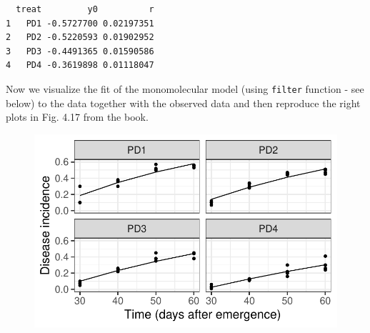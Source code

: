 \documentclass[
  letterpaper,
  DIV=11,
  numbers=noendperiod]{scrreprt}
\newenvironment{Shaded}{\begin{snugshade}}{\end{snugshade}}
\newcommand{\AttributeTok}[1]{\textcolor[rgb]{0.40,0.45,0.13}{#1}}
\newcommand{\CommentTok}[1]{\textcolor[rgb]{0.37,0.37,0.37}{#1}}
\newcommand{\DecValTok}[1]{\textcolor[rgb]{0.68,0.00,0.00}{#1}}
\newcommand{\FloatTok}[1]{\textcolor[rgb]{0.68,0.00,0.00}{#1}}
\newcommand{\FunctionTok}[1]{\textcolor[rgb]{0.28,0.35,0.67}{#1}}
\newcommand{\NormalTok}[1]{\textcolor[rgb]{0.00,0.23,0.31}{#1}}
\newcommand{\SpecialCharTok}[1]{\textcolor[rgb]{0.37,0.37,0.37}{#1}}
\newcommand{\StringTok}[1]{\textcolor[rgb]{0.13,0.47,0.30}{#1}}
\begin{document}
\begin{verbatim}
  treat         y0          r
1   PD1 -0.5727700 0.02197351
2   PD2 -0.5220593 0.01902952
3   PD3 -0.4491365 0.01590586
4   PD4 -0.3619898 0.01118047
\end{verbatim}

Now we visualize the fit of the monomolecular model (using
\texttt{filter} function - see below) to the data together with the
observed data and then reproduce the right plots in Fig. 4.17 from the
book.

\begin{Shaded}
\end{Shaded}

\begin{figure}[H]

{\centering \includegraphics{./temporal-fitting_files/figure-pdf/unnamed-chunk-42-1.pdf}

}

\end{figure}
\end{document}
